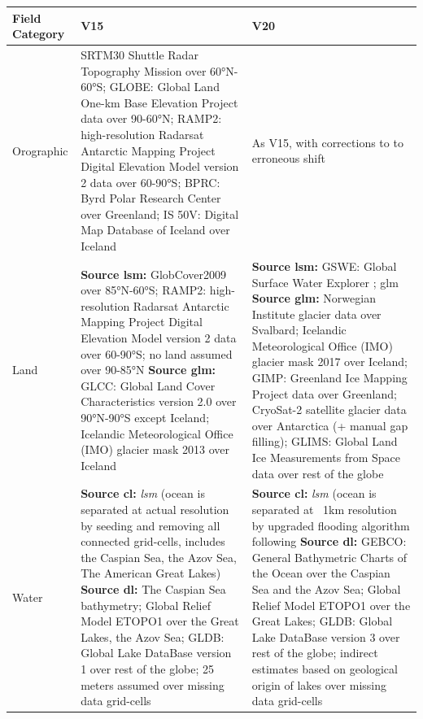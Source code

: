 \documentclass[hess, twostagejnl]{copernicus}
\begin{document}
\begin{table}
	\begin{tabularx}{\textwidth}{lXX}
		\toprule 
		Field Category & V15 & V20 \\
		\hline
		Orographic & SRTM30 Shuttle Radar Topography Mission over 60°N-60°S; GLOBE: Global Land One-km Base Elevation Project data over 90-60°N; RAMP2: high-resolution Radarsat Antarctic Mapping Project Digital Elevation Model version 2 data \citep{Liu2015} over 60-90°S; BPRC: Byrd Polar Research Center over Greenland; IS 50V: Digital Map Database of Iceland over Iceland & As V15, with corrections to to erroneous shift
		\\
		\hline 
		Land   & \textbf{Source lsm:} GlobCover2009 \citep{GLOBCOVER,arino2012glcm} over 85°N-60°S; RAMP2: high-resolution Radarsat Antarctic Mapping Project Digital Elevation Model version 2 data \citep{Liu2015} over 60-90°S; no land assumed over 90-85°N \newline  
		\textbf{Source glm:} GLCC: Global Land Cover Characteristics version 2.0 over 90°N-90°S except Iceland; Icelandic Meteorological Office (IMO) glacier mask 2013 over Iceland
		 & \textbf{Source lsm:} GSWE: Global Surface Water Explorer \citep{GSWE}; glm \newline 
		 \textbf{Source glm:} Norwegian Institute glacier data over Svalbard; Icelandic Meteorological Office (IMO) glacier mask 2017 over Iceland; GIMP: Greenland Ice Mapping Project data \citep{Howat2014} over Greenland; CryoSat-2 satellite glacier data \citep{Slater2018} over Antarctica (+ manual gap filling);  GLIMS: Global Land Ice Measurements from Space data \citep{glims} over rest of the globe \\
		\hline
				Water   & 
				\textbf{Source cl:} \textit{lsm} (ocean is separated at actual resolution by seeding and removing all connected grid-cells, includes the Caspian Sea, the Azov Sea, The American Great Lakes) \newline 
				\textbf{Source dl:} The Caspian Sea bathymetry; Global Relief Model ETOPO1 \citep{amante2009egrm} over the Great Lakes, the Azov Sea; GLDB: Global Lake DataBase version 1 \citep{Kourzeneva2012} over rest of the globe; 25 meters assumed over missing data grid-cells
		& \textbf{Source cl:} \textit{lsm} (ocean is separated at ~1km resolution by upgraded flooding algorithm following \cite{Choulga2019} \newline 
		\textbf{Source dl:} GEBCO: General Bathymetric Charts of the Ocean \citep{Weatherall2015} over the Caspian Sea and the Azov Sea; Global Relief Model ETOPO1 \citep{amante2009egrm} over the Great Lakes; GLDB: Global Lake DataBase version 3 \citep{Choulga2014} over rest of the globe; indirect estimates based on geological origin of lakes \citep{Choulga2014} over missing data grid-cells \\

\end{tabularx}
\end{table}
\end{document}
